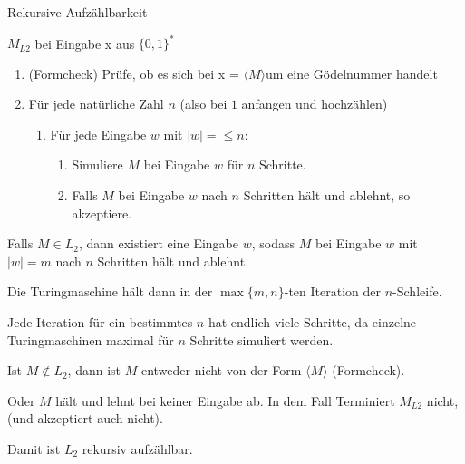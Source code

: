 \documentclass[answers]{submit}
\begin{document}
\begin{exercise}[6]{Rekursive Aufzählbarkeit}
{    $M_{L2}$ bei Eingabe x aus $\{0,1\}^*$

    \begin{enumerate}
      \item (Formcheck) Prüfe, ob es sich bei x = $\langle M \rangle$um eine Gödelnummer handelt
      \item Für jede natürliche Zahl $n$ (also bei $1$ anfangen und hochzählen)
            \begin{enumerate}
              \item Für jede Eingabe $w$ mit $|w|=\leq n$:
                    \begin{enumerate}
                      \item Simuliere $M$ bei Eingabe $w$ für $n$ Schritte.
                      \item Falls $M$ bei Eingabe $w$ nach $n$ Schritten hält und ablehnt, so akzeptiere.
                    \end{enumerate}
            \end{enumerate}
    \end{enumerate}

    Falls $M\in L_2$, dann existiert eine Eingabe $w$, sodass $M$ bei Eingabe $w$ mit $|w|=m$ nach $n$ Schritten hält und ablehnt.

    Die Turingmaschine hält dann in der $\max\{m,n\}$-ten Iteration der $n$-Schleife.

    Jede Iteration für ein bestimmtes $n$ hat endlich viele Schritte, da einzelne Turingmaschinen maximal für $n$ Schritte simuliert werden.

    Ist $M\notin L_2$, dann ist $M$ entweder nicht von der Form $\langle M \rangle$ (Formcheck).

    Oder $M$ hält und lehnt bei keiner Eingabe ab. In dem Fall Terminiert $M_{L2}$ nicht, (und akzeptiert auch nicht).

    Damit ist $L_2$ rekursiv aufzählbar.


  }
\end{exercise}
\end{document}
